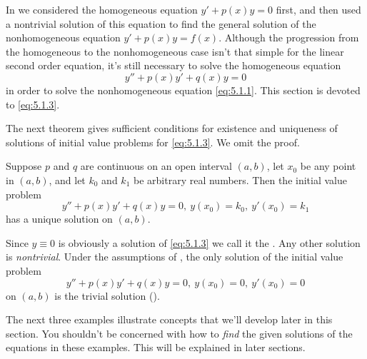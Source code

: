 In  we considered the homogeneous equation
$y'+p(x)y=0$ first, and then used a nontrivial solution of this
equation to find the general solution of the nonhomogeneous equation
$y'+p(x)y=f(x)$. Although the progression from the homogeneous to the
nonhomogeneous case isn't  that simple for the linear second order
equation, it's still necessary to solve the homogeneous equation
\begin{equation}\label{eq:5.1.3}
y''+p(x)y'+q(x)y=0
\end{equation}
in order to solve the nonhomogeneous equation \eqref{eq:5.1.1}. This
section is devoted to \eqref{eq:5.1.3}.

The next theorem gives sufficient conditions for existence and
uniqueness of solutions of initial value problems for \eqref{eq:5.1.3}. We
omit the proof.

\begin{theorem}\label{thmtype:5.1.1}
Suppose $p$ and $q$ are continuous on an open interval $(a,b)$,
let $x_0$ be any point in $(a,b)$, and let $k_0$ and $k_1$ be
arbitrary real numbers. Then the initial value problem
\[
y''+p(x)y'+q(x)y=0,\ y(x_0)=k_0,\ y'(x_0)=k_1
\]
 has a unique solution  on $(a,b)$.
\end{theorem}

Since $y\equiv0$ is obviously a solution of \eqref{eq:5.1.3} we call it the
.
Any other solution is
\emph{\color{blue}nontrivial}.
Under the assumptions of , the only solution of
the initial value problem
\[
y''+p(x)y'+q(x)y=0,\ y(x_0)=0,\ y'(x_0)=0
\]
on  $(a,b)$ is the trivial solution
().

The next three examples illustrate concepts that we'll develop later
in this section. You shouldn't be concerned with how to \emph{\color{blue}find}
the given solutions of the equations in these examples. This will be
explained in later sections.

